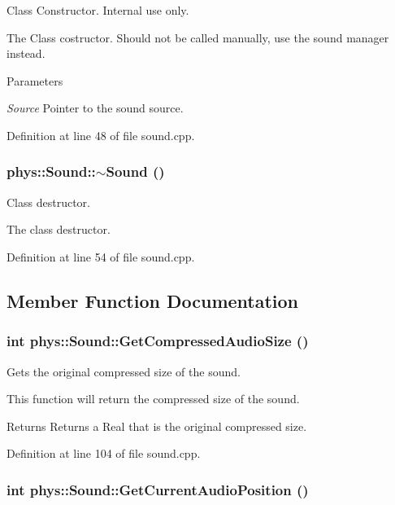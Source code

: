 Class Constructor. Internal use only. 

The Class costructor. Should not be called manually, use the sound manager instead. 
\begin{DoxyParams}{Parameters}
\item[{\em Source}]Pointer to the sound source. \end{DoxyParams}


Definition at line 48 of file sound.cpp.

\hypertarget{classphys_1_1Sound_ad49df56479e003d0990a5dcb1c506d39}{
\subsubsection[{$\sim$Sound}]{\setlength{\rightskip}{0pt plus 5cm}phys::Sound::$\sim$Sound ()}}
\label{dc/d2f/classphys_1_1Sound_ad49df56479e003d0990a5dcb1c506d39}


Class destructor. 

The class destructor. 

Definition at line 54 of file sound.cpp.



\subsection{Member Function Documentation}
\hypertarget{classphys_1_1Sound_af568fd5293ecab6185f509e52209a0a2}{
\subsubsection[{GetCompressedAudioSize}]{\setlength{\rightskip}{0pt plus 5cm}int phys::Sound::GetCompressedAudioSize ()}}
\label{dc/d2f/classphys_1_1Sound_af568fd5293ecab6185f509e52209a0a2}


Gets the original compressed size of the sound. 

This function will return the compressed size of the sound. \begin{DoxyReturn}{Returns}
Returns a Real that is the original compressed size. 
\end{DoxyReturn}


Definition at line 104 of file sound.cpp.

\hypertarget{classphys_1_1Sound_a0ef4ddd4096758f9c883fe93194b9b3b}{
\subsubsection[{GetCurrentAudioPosition}]{\setlength{\rightskip}{0pt plus 5cm}int phys::Sound::GetCurrentAudioPosition ()}}
\label{dc/d2f/classphys_1_1Sound_a0ef4ddd4096758f9c883fe93194b9b3b}


